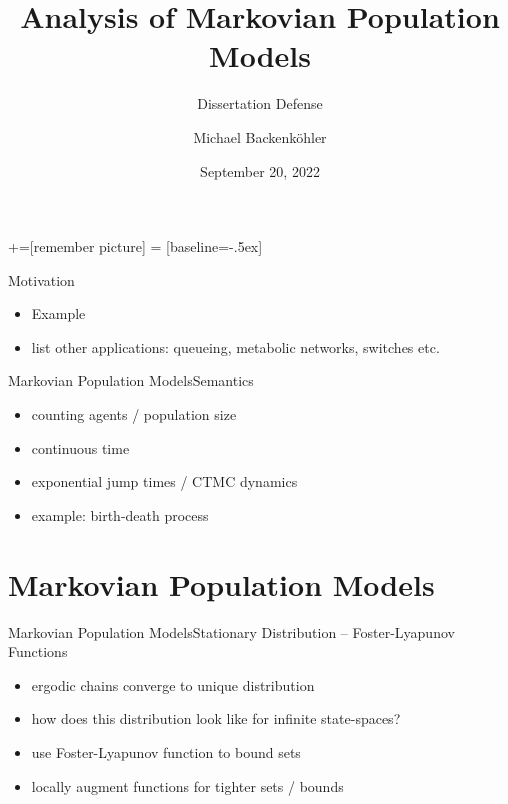 \documentclass{beamer}
\title{Analysis of Markovian Population Models}
\subtitle{Dissertation Defense}
\author{Michael Backenk\"{o}hler}
\institute{Saarland Informatics Campus}
\date{September 20, 2022}
\begin{document}
+=[remember picture]
 = [baseline=-.5ex]

\begin{frame}
\titlepage
\end{frame}

\begin{frame}{Motivation}
  \begin{itemize}
    \item Example
    \item list other applications: queueing, metabolic networks, switches etc.
  \end{itemize}
\end{frame}

\begin{frame}{Markovian Population Models}{Semantics}
  \begin{itemize}
    \item counting agents / population size
    \item continuous time
    \item exponential jump times / CTMC dynamics
    \item example: birth-death process
  \end{itemize}
\end{frame}

\section{Markovian Population Models}
\begin{frame}{Markovian Population Models}{Stationary Distribution -- Foster-Lyapunov Functions}
    \begin{itemize}
        \item ergodic chains converge to unique distribution
        \item how does this distribution look like for infinite state-spaces?
        \item use Foster-Lyapunov function to bound sets
        \item locally augment functions for tighter sets / bounds
    \end{itemize}
\end{frame}
\end{document}
